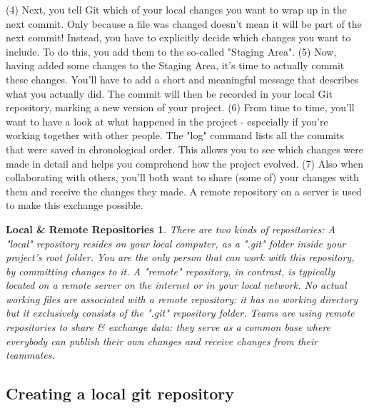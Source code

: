 \documentclass{article}
\begin{document}
\newline\newline
(4) Next, you tell Git which of your local changes you want to wrap up in the next commit. Only because a file was changed doesn't mean it will be part of the next commit! Instead, you have to explicitly decide which changes you want to include. To do this, you add them to the so-called "Staging Area".
\newline\newline
(5) Now, having added some changes to the Staging Area, it's time to actually commit these changes. You'll have to add a short and meaningful message that describes what you actually did. The commit will then be recorded in your local Git repository, marking a new version of your project.
\newline\newline
(6) From time to time, you'll want to have a look at what happened in the project - especially if you're working together with other people. The "log" command lists all the commits that were saved in chronological order. This allows you to see which changes were made in detail and helps you comprehend how the project evolved.
\newline\newline
(7) Also when collaborating with others, you'll both want to share (some of) your changes with them and receive the changes they made. A remote repository on a server is used to make this exchange possible.
 
 \newtheorem*{local-remote-repos}{Local \& Remote Repositories}
 \begin{local-remote-repos}
 There are two kinds of repositories:
\newline
A "local" repository resides on your local computer, as a ".git" folder inside your project's root folder. You are the only person that can work with this repository, by committing changes to it.
A "remote" repository, in contrast, is typically located on a remote server on the internet or in your local network. No actual working files are associated with a remote repository: it has no working directory but it exclusively consists of the ".git" repository folder. Teams are using remote repositories to share \& exchange data: they serve as a common base where everybody can publish their own changes and receive changes from their teammates.
\end{local-remote-repos}

\subsection{Creating a local git repository}
\end{document}
